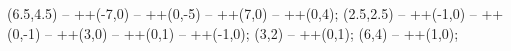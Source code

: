  (6.5,4.5) -- ++(-7,0) -- ++(0,-5) -- ++(7,0) -- ++(0,4);
 (2.5,2.5) -- ++(-1,0) -- ++(0,-1) -- ++(3,0) -- ++(0,1) -- ++(-1,0);
 (3,2) -- ++(0,1);
 (6,4) -- ++(1,0);
